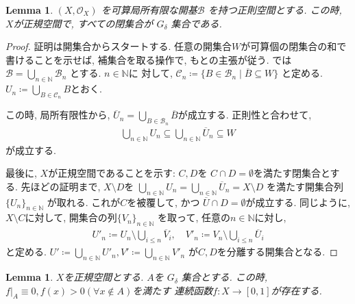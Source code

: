 \documentclass[lualatex]{ltjsbook}
\newcommand{\cl}[1]{\overline{ #1}  }
\newtheorem{lemma}[theorem]{Lemma}
\theoremstyle{remark}
\theoremstyle{plain}
\begin{document}
\begin{lemma}
\label{lemma:local-regular-normal}
  $\left( X , \mathcal{O}_{X} \right)$ を可算局所有限な開基$\mathcal{B}$ を持つ正則空間とする. 
  この時, $X$が正規空間で, すべての閉集合が $G_{\delta}$ 集合である. 
\end{lemma}

\begin{proof}
  証明は開集合からスタートする. 任意の開集合$W$が可算個の閉集合の和で書けることを示せば, 
  補集合を取る操作で, もとの主張が従う. 
  では $\mathcal{B}= \bigcup_{n \in \mathbb{N}} \mathcal{B}_n$ とする. $n \in \mathbb{N}$に
  対して, $\mathcal{C}_n \coloneqq \{B \in \mathcal{B}_n \mid \cl{B} \subseteq W\} $ 
  と定める. $U_n \coloneqq \bigcup_{B \in \mathcal{C}_n} B$とおく.

  この時, 局所有限性から,  $\cl{U}_n = \bigcup_{B \in \mathcal{B}_n}\cl{B} $が成立する. 
  正則性と合わせて, 
   \begin{equation*}
    \begin{aligned}
      \bigcup_{n \in \mathbb{N}}U_n \subseteq \bigcup_{n \in \mathbb{N}} \cl{U}_n \subseteq W  
    \end{aligned}
  \end{equation*}
  が成立する.


  最後に, $X$が正規空間であることを示す: 
  $C,D$を $C \cap D = \emptyset$を満たす閉集合とする. 先ほどの証明まで, $X \setminus D$を
  $\bigcup_{n \in \mathbb{N}} U_n = \bigcup_{n \in  \mathbb{N}} \cl{U}_n = X\setminus D$
  を満たす開集合列$ \{U_n\}_{n \in \mathbb{N}} $ が取れる. これが$C$を被覆して, かつ
  $\cl{U} \cap D = \emptyset$が成立する. 同じように, $X \setminus C$に対して, 
  開集合の列$\{V_n\}_{n \in \mathbb{N}} $ を取って, 
  任意の$n \in \mathbb{N}$に対し, 
  \begin{equation*}
    \begin{aligned}
      U'_n \coloneqq U_n \setminus \bigcup_{i \leq n} \cl{V}_i, \quad V'_n \coloneqq V_n \setminus \bigcup_{i \leq n} \cl{U}_i  
    \end{aligned}
  \end{equation*}
  と定める. $U' \coloneqq \bigcup_{n \in \mathbb{N}} U'_n, V'\coloneqq \bigcup_{n \in \mathbb{N}} V'_n$
  が$C,D$を分離する開集合となる. 
\end{proof}

\begin{lemma}
\label{lemma:closed-continuous}
  $X$を正規空間とする.  $A$を $G_{\delta}$ 集合とする. この時, $f|_A \equiv 0, f(x)>0 (\forall x \not\in A)$を満たす
  連続函数$f:X \to [0,1]$が存在する.
\end{lemma}
\end{document}
